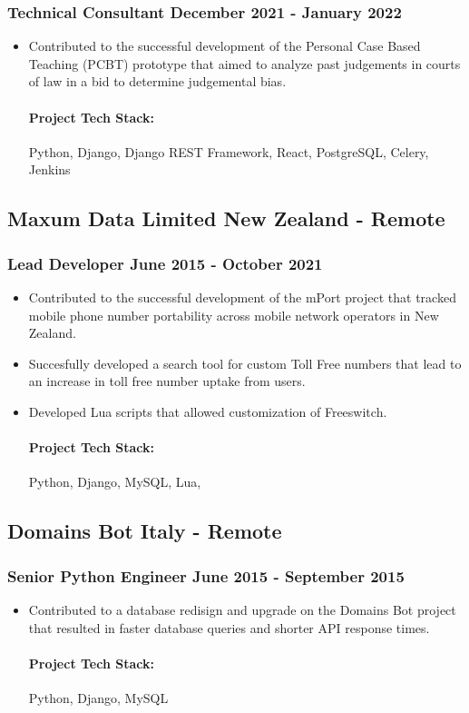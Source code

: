 \documentclass[11pt]{article} %
\begin{document}
\subsubsection{Technical Consultant \hfill  December 2021 - January 2022}
\begin{itemize}
    \item Contributed to the successful development of the Personal Case Based Teaching (PCBT) prototype that aimed to analyze past judgements in courts of law in a bid to determine judgemental bias.

    \paragraph{Project Tech Stack:} Python, Django, Django REST Framework, React, PostgreSQL, Celery, Jenkins
\end{itemize}


\subsection{Maxum Data Limited \hfill New Zealand - Remote}
\subsubsection{Lead Developer \hfill  June 2015 - October 2021}
\begin{itemize}
    \item Contributed to the successful development of the mPort project that tracked mobile phone number portability across mobile network operators in New Zealand.
    \item Succesfully developed a search tool for custom Toll Free numbers that lead to an increase in toll free number uptake from users.
    \item Developed Lua scripts that allowed customization of Freeswitch. 

    \paragraph{Project Tech Stack:} Python, Django, MySQL, Lua,
\end{itemize}

\subsection{Domains Bot \hfill Italy - Remote}
\subsubsection{Senior Python Engineer \hfill  June 2015 - September 2015}
\begin{itemize}
    \item Contributed to a database redisign and upgrade on the Domains Bot project that resulted in faster database queries and shorter API response times.
    \paragraph{Project Tech Stack:} Python, Django, MySQL
\end{itemize}
\end{document}
